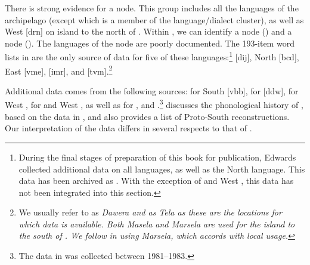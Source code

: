 There is strong evidence for a  node.
This group includes all the languages of the  archipelago
(except  which is a member of the  language/dialect
cluster), as well as West  [drn] on  island to the north of .
Within , we can identify a 
node () and a  node ().
The languages of the  node are poorly documented.
The 193-item word lists in \citet{Taber1993} are the only source
of data for five of these languages:\footnote{
		During the final stages of preparation of
		this book for publication, Edwards
		collected additional data on all 
		languages, as well as the North  language.
		This data has been archived as \citet{Edwards2023}.
		With the exception of  and West ,
		this data has not been integrated into this section.}
 [dij], North  [bcd], East  [vme],  [imr], and  [tvm].\footnote{
		We usually
		refer to  as \it{Dawera}
		and  as \it{Tela} as these are the locations for
		which data is available.
		Both \it{Masela} and \it{Marsela} are used for the island to
		the south of .
		We follow \citeauthor{vanDijk2019} in using \it{Marsela},
		which accords with local usage.}

Additional data comes from
the following sources: \citet{Steinhauer2009} for South 
[vbb], \citet{Chlenova2002,Chlenova2012} for  [ddw],
\citet{ChlenovChlenova2008b} for West ,
\citet{Edwards2023} for  and West , as well as \citet{vanDijk2021}
			for  , and .\footnote{
			The data in \citet{vanDijk2021}
			was collected between 1981--1983.}
\citet{Zobel2018} discusses
the phonological history of ,
based on the data in \citet{Taber1993},
and also provides a list of Proto-South  reconstructions.
Our interpretation of the data differs in
several respects to that of \citet{Zobel2018}.

